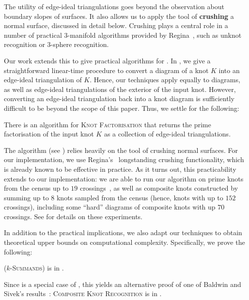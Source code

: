 \documentclass[a4paper,UKenglish,cleveref, autoref, thm-restate]{lipics-v2021}
\begin{document}
The utility of edge-ideal triangulations goes beyond the observation about boundary slopes of surfaces.
It also allows us to apply the tool of \textbf{crushing} a normal surface, discussed in detail below. Crushing plays a central role in a number of practical $3$-manifold algorithms provided by Regina~\cite{burton2013regina,burton2014crushing,Regina}, such as unknot recognition or $3$-sphere recognition.

Our work extends this to give practical algorithms for .
In , we give a straightforward linear-time procedure to convert
a diagram of a knot $K$ into an edge-ideal triangulation of $K$. Hence, our techniques
apply equally to diagrams, as well as edge-ideal triangulations of the exterior of the
input knot. However, converting an edge-ideal triangulation back into a knot diagram is
sufficiently difficult to be beyond the scope of this paper. Thus, we settle for the following:

\begin{theorem}\label{thm:summandsAlgo}
There is an algorithm  for \textup{\textsc{Knot Factorisation}} that
returns the prime factorisation of the input knot $K$ as a collection of edge-ideal triangulations.
\end{theorem}

The algorithm (see ) relies heavily on the tool of crushing normal surfaces.
For our implementation, we use Regina's~\cite{Regina} longstanding crushing functionality, which is already known to be effective in practice.
As it turns out, this practicability extends to our implementation: we are able to run our algorithm on prime knots from the census up to $19$ crossings~\cite{burton2020knots},
as well as composite knots constructed by summing up to $8$ knots sampled from the census (hence, knots with up to $152$ crossings), including some ``hard'' diagrams of composite knots with up $70$ crossings.
See  for details on these experiments.

In addition to the practical implications, we also adapt our techniques to obtain theoretical upper bounds on computational complexity. Specifically, we prove the following:

\begin{theorem}\label{thm:summandsNP}
 ($k$\textup{-\textsc{Summands}}) is in \NP.
\end{theorem}

Since  is a special case of , this yields an alternative proof of one of Baldwin and Sivek's results~\cite[Theorem~7.3]{baldwin2019complexity}:
\textsc{Composite Knot Recognition} is in \NP.
\end{document}
